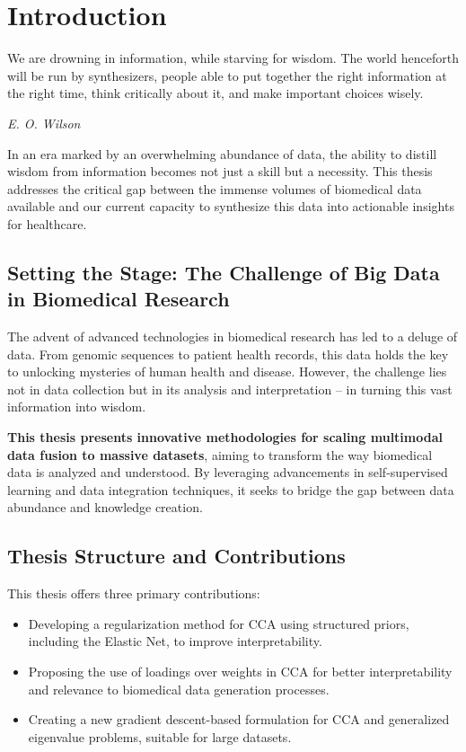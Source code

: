 \graphicspath{{chapters/introduction/}}
\chapter{Introduction}\label{chap:introduction}

\epigraph{We are drowning in information, while starving for wisdom. The world henceforth will be run by synthesizers, people able to put together the right information at the right time, think critically about it, and make important choices wisely.}{\textit{E. O. Wilson}}

In an era marked by an overwhelming abundance of data, the ability to distill wisdom from information becomes not just a skill but a necessity. This thesis addresses the critical gap between the immense volumes of biomedical data available and our current capacity to synthesize this data into actionable insights for healthcare.

\section{Setting the Stage: The Challenge of Big Data in Biomedical Research}

The advent of advanced technologies in biomedical research has led to a deluge of data.
From genomic sequences to patient health records, this data holds the key to unlocking mysteries of human health and disease.
However, the challenge lies not in data collection but in its analysis and interpretation – in turning this vast information into wisdom.

\textbf{This thesis presents innovative methodologies for scaling multimodal data fusion to massive datasets}, aiming to transform the way biomedical data is analyzed and understood.
By leveraging advancements in self-supervised learning and data integration techniques, it seeks to bridge the gap between data abundance and knowledge creation.

\section{Thesis Structure and Contributions}

This thesis offers three primary contributions:

\begin{itemize}
    \item Developing a regularization method for CCA using structured priors, including the Elastic Net, to improve interpretability.
    \item Proposing the use of loadings over weights in CCA for better interpretability and relevance to biomedical data generation processes.
    \item Creating a new gradient descent-based formulation for CCA and generalized eigenvalue problems, suitable for large datasets.
\end{itemize}

